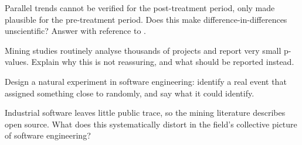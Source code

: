 \begin{reviewq}
  \item Parallel trends cannot be verified for the post-treatment period, only
    made plausible for the pre-treatment period. Does this make
    difference-in-differences unscientific? Answer with reference to
    .
  \item Mining studies routinely analyse thousands of projects and report very
    small p-values. Explain why this is not reassuring, and what should be
    reported instead.
  \item Design a natural experiment in software engineering: identify a real
    event that assigned something close to randomly, and say what it could
    identify.
  \item Industrial software leaves little public trace, so the mining
    literature describes open source. What does this systematically distort in
    the field's collective picture of software engineering?
\end{reviewq}
